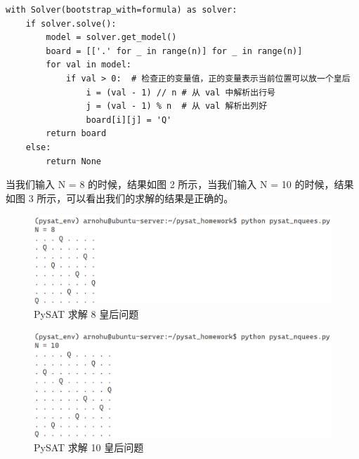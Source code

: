 \documentclass{article}
\begin{document}
\begin{lstlisting}
with Solver(bootstrap_with=formula) as solver:
    if solver.solve():
        model = solver.get_model()
        board = [['.' for _ in range(n)] for _ in range(n)]
        for val in model:
            if val > 0:  # 检查正的变量值，正的变量表示当前位置可以放一个皇后
                i = (val - 1) // n # 从 val 中解析出行号
                j = (val - 1) % n  # 从 val 解析出列好
                board[i][j] = 'Q'
        return board
    else:
        return None
\end{lstlisting}

当我们输入 N = 8 的时候，结果如图 2 所示，当我们输入 N = 10 的时候，结果如图 3 所示，可以看出我们的求解的结果是正确的。

\begin{figure}[h]
    \centering
    \includegraphics[width=1.0\textwidth]{figures/nqueens_8.png}
    \caption{PySAT 求解 8 皇后问题}
\end{figure}

\begin{figure}[h]
    \centering
    \includegraphics[width=1.0\textwidth]{figures/nqueens_10.png}
    \caption{PySAT 求解 10 皇后问题}
\end{figure}
\end{document}

